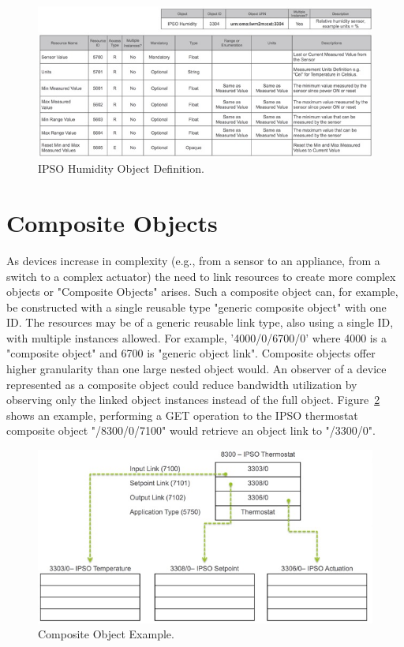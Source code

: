 \documentclass[peerreview, a4paper, 7pt]{IEEEtran}
\begin{document}
\begin{figure}[!htbp]
 \centering
 \includegraphics[scale=0.90]{humidity-object.jpg}
 \caption{IPSO Humidity Object Definition.}
 \label{humidity-object-figure}
\end{figure}


\section{Composite Objects}

As devices increase in complexity (e.g., from a sensor to an appliance, from a switch to a complex actuator) the need to link resources to create more complex objects or "Composite Objects" arises. Such a composite object can, for example, be constructed with a single reusable type "generic composite object" with one ID. The resources may be of a generic reusable link type, also using a single ID, with multiple instances allowed. For example, '4000/0/6700/0' where 4000 is a "composite object" and 6700 is "generic object link". Composite objects offer higher granularity than one large nested object would. An observer of a device represented as a composite object could reduce bandwidth utilization by observing only the linked object instances instead of the full object. Figure~\ref{composite-object-figure} shows an example, performing a GET operation to the IPSO thermostat composite object "/8300/0/7100" would retrieve an object link to "/3300/0".


\begin{figure}[!htbp]
 \centering
 \includegraphics[scale=0.80]{composite-object.jpg}
 \caption{Composite Object Example.}
 \label{composite-object-figure}
\end{figure}
\end{document}
